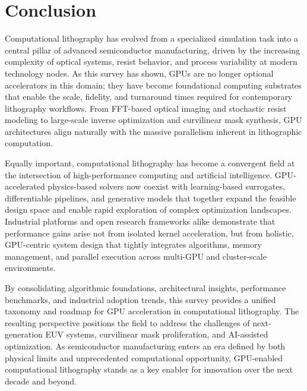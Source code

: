 \documentclass[pdflatex,sn-mathphys-num]{sn-jnl}%
\theoremstyle{thmstyleone}%
\theoremstyle{thmstyletwo}%
\theoremstyle{thmstylethree}%
\begin{document}
  
\section{Conclusion}
Computational lithography has evolved from a specialized simulation task into a central pillar of advanced semiconductor manufacturing, driven by the increasing complexity of optical systems, resist behavior, and process variability at modern technology nodes. As this survey has shown, GPUs are no longer optional accelerators in this domain; they have become foundational computing substrates that enable the scale, fidelity, and turnaround times required for contemporary lithography workflows. From FFT-based optical imaging and stochastic resist modeling to large-scale inverse optimization and curvilinear mask synthesis, GPU architectures align naturally with the massive parallelism inherent in lithographic computation.

Equally important, computational lithography has become a convergent field at the intersection of high-performance computing and artificial intelligence. GPU-accelerated physics-based solvers now coexist with learning-based surrogates, differentiable pipelines, and generative models that together expand the feasible design space and enable rapid exploration of complex optimization landscapes. Industrial platforms and open research frameworks alike demonstrate that performance gains arise not from isolated kernel acceleration, but from holistic, GPU-centric system design that tightly integrates algorithms, memory management, and parallel execution across multi-GPU and cluster-scale environments.

By consolidating algorithmic foundations, architectural insights, performance benchmarks, and industrial adoption trends, this survey provides a unified taxonomy and roadmap for GPU acceleration in computational lithography. The resulting perspective positions the field to address the challenges of next-generation EUV systems, curvilinear mask proliferation, and AI-assisted optimization. As semiconductor manufacturing enters an era defined by both physical limits and unprecedented computational opportunity, GPU-enabled computational lithography stands as a key enabler for innovation over the next decade and beyond.
  

\end{document}
